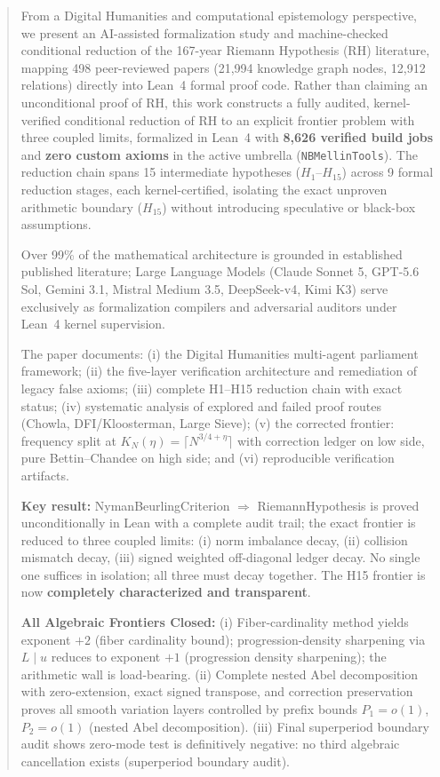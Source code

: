 \documentclass[11pt,a4paper]{article}
\theoremstyle{plain}
\theoremstyle{definition}
\theoremstyle{remark}
\begin{document}
\begin{abstract}
From a Digital Humanities and computational epistemology perspective, we present an AI-assisted formalization study and machine-checked conditional reduction of the 167-year Riemann Hypothesis (RH) literature, mapping 498 peer-reviewed papers (21,994 knowledge graph nodes, 12,912 relations) directly into Lean~4 formal proof code. Rather than claiming an unconditional proof of RH, this work constructs a fully audited, kernel-verified conditional reduction of RH to an explicit frontier problem with three coupled limits, formalized in Lean~4 with \textbf{8,626 verified build jobs} and \textbf{zero custom axioms} in the active umbrella (\texttt{NBMellinTools}). The reduction chain spans 15 intermediate hypotheses ($H_1$--$H_{15}$) across 9 formal reduction stages, each kernel-certified, isolating the exact unproven arithmetic boundary ($H_{15}$) without introducing speculative or black-box assumptions.

Over 99\% of the mathematical architecture is grounded in established published literature; Large Language Models (Claude Sonnet 5, GPT-5.6 Sol, Gemini 3.1, Mistral Medium 3.5, DeepSeek-v4, Kimi K3) serve exclusively as formalization compilers and adversarial auditors under Lean~4 kernel supervision.

The paper documents: (i) the Digital Humanities multi-agent parliament framework; (ii) the five-layer verification architecture and remediation of legacy false axioms; (iii) complete H1--H15 reduction chain with exact status; (iv) systematic analysis of explored and failed proof routes (Chowla, DFI/Kloosterman, Large Sieve); (v) the corrected frontier: frequency split at $K_N(\eta)=\lceil N^{3/4+\eta}\rceil$ with correction ledger on low side, pure Bettin--Chandee on high side; and (vi) reproducible verification artifacts.

\textbf{Key result:} NymanBeurlingCriterion $\Rightarrow$ RiemannHypothesis is proved unconditionally in Lean with a complete audit trail; the exact frontier is reduced to three coupled limits: (i) norm imbalance decay, (ii) collision mismatch decay, (iii) signed weighted off-diagonal ledger decay. No single one suffices in isolation; all three must decay together. The H15 frontier is now \textbf{completely characterized and transparent}.

\textbf{All Algebraic Frontiers Closed:} (i) Fiber-cardinality method yields exponent $+2$ (fiber cardinality bound); progression-density sharpening via $L \mid u$ reduces to exponent $+1$ (progression density sharpening); the arithmetic wall is load-bearing. (ii) Complete nested Abel decomposition with zero-extension, exact signed transpose, and correction preservation proves all smooth variation layers controlled by prefix bounds $P_1=o(1)$, $P_2=o(1)$ (nested Abel decomposition). (iii) Final superperiod boundary audit shows zero-mode test is definitively negative: no third algebraic cancellation exists (superperiod boundary audit).


\end{abstract}
\end{document}
